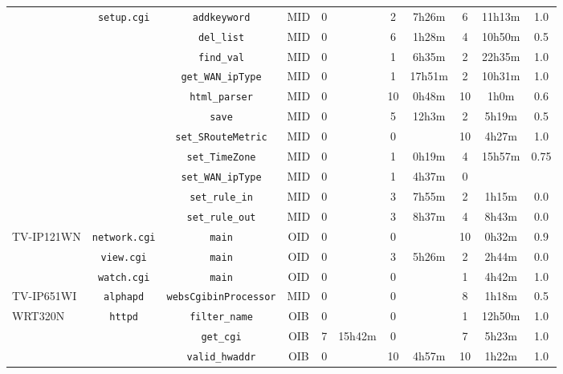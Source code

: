 \begin{table}[ht]
\begin{tabular}{|l||c|c|c|c|c|c|c|c|c|c|}
 & \multirow{11}{*}{\texttt{setup.cgi}} & \texttt{addkeyword} & MID & 0 &  & 2 & 7h26m & 6 & 11h13m & 1.0 \\
\cline{3-11}
 &  & \texttt{del\_list} & MID & 0 &  & 6 & 1h28m & 4 & 10h50m & 0.5 \\
\cline{3-11}
 &  & \texttt{find\_val} & MID & 0 &  & 1 & 6h35m & 2 & 22h35m & 1.0 \\
\cline{3-11}
 &  & \texttt{get\_WAN\_ipType} & MID & 0 &  & 1 & 17h51m & 2 & 10h31m & 1.0 \\
\cline{3-11}
 &  & \texttt{html\_parser} & MID & 0 &  & 10 & 0h48m & 10 & 1h0m & 0.6 \\
\cline{3-11}
 &  & \texttt{save} & MID & 0 &  & 5 & 12h3m & 2 & 5h19m & 0.5 \\
\cline{3-11}
 &  & \texttt{set\_SRouteMetric} & MID & 0 &  & 0 &  & 10 & 4h27m & 1.0 \\
\cline{3-11}
 &  & \texttt{set\_TimeZone} & MID & 0 &  & 1 & 0h19m & 4 & 15h57m & 0.75 \\
\cline{3-11}
 &  & \texttt{set\_WAN\_ipType} & MID & 0 &  & 1 & 4h37m & 0 &  &  \\
\cline{3-11}
 &  & \texttt{set\_rule\_in} & MID & 0 &  & 3 & 7h55m & 2 & 1h15m & 0.0 \\
\cline{3-11}
 &  & \texttt{set\_rule\_out} & MID & 0 &  & 3 & 8h37m & 4 & 8h43m & 0.0 \\
\cline{3-11}
\cline{2-11}
\cline{1-1}
\multirow{3}{*}{TV-IP121WN} & \multirow{1}{*}{\texttt{network.cgi}} & \texttt{main} & OID & 0 &  & 0 &  & 10 & 0h32m & 0.9 \\
\cline{3-11}
\cline{2-11}
 & \multirow{1}{*}{\texttt{view.cgi}} & \texttt{main} & OID & 0 &  & 3 & 5h26m & 2 & 2h44m & 0.0 \\
\cline{3-11}
\cline{2-11}
 & \multirow{1}{*}{\texttt{watch.cgi}} & \texttt{main} & OID & 0 &  & 0 &  & 1 & 4h42m & 1.0 \\
\cline{3-11}
\cline{2-11}
\cline{1-1}
\multirow{1}{*}{TV-IP651WI} & \multirow{1}{*}{\texttt{alphapd}} & \texttt{websCgibinProcessor} & MID & 0 &  & 0 &  & 8 & 1h18m & 0.5 \\
\cline{3-11}
\cline{2-11}
\cline{1-1}
\multirow{6}{*}{WRT320N} & \multirow{6}{*}{\texttt{httpd}} & \texttt{filter\_name} & OIB & 0 &  & 0 &  & 1 & 12h50m & 1.0 \\
\cline{3-11}
 &  & \texttt{get\_cgi} & OIB & 7 & 15h42m & 0 &  & 7 & 5h23m & 1.0 \\
\cline{3-11}
 &  & \texttt{valid\_hwaddr} & OIB & 0 &  & 10 & 4h57m & 10 & 1h22m & 1.0 \\

\end{tabular}
\end{table}
